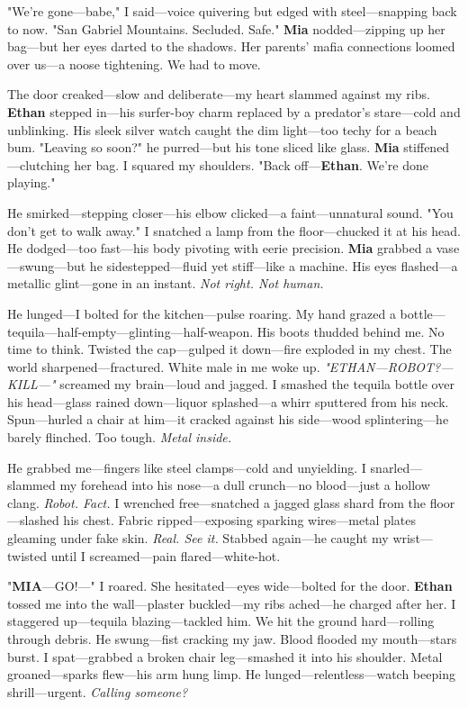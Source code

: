 \documentclass{article}
\begin{document}
"We’re gone—babe," I said—voice quivering but edged with steel—snapping back to now. "San Gabriel Mountains. Secluded. Safe." \textbf{Mia} nodded—zipping up her bag—but her eyes darted to the shadows. Her parents’ mafia connections loomed over us—a noose tightening. We had to move.

The door creaked—slow and deliberate—my heart slammed against my ribs. \textbf{Ethan} stepped in—his surfer-boy charm replaced by a predator’s stare—cold and unblinking. His sleek silver watch caught the dim light—too techy for a beach bum. "Leaving so soon?" he purred—but his tone sliced like glass. \textbf{Mia} stiffened—clutching her bag. I squared my shoulders. "Back off—\textbf{Ethan}. We’re done playing."

He smirked—stepping closer—his elbow clicked—a faint—unnatural sound. "You don’t get to walk away." I snatched a lamp from the floor—chucked it at his head. He dodged—too fast—his body pivoting with eerie precision. \textbf{Mia} grabbed a vase—swung—but he sidestepped—fluid yet stiff—like a machine. His eyes flashed—a metallic glint—gone in an instant. \textit{Not right. Not human.}

He lunged—I bolted for the kitchen—pulse roaring. My hand grazed a bottle—tequila—half-empty—glinting—half-weapon. His boots thudded behind me. No time to think. Twisted the cap—gulped it down—fire exploded in my chest. The world sharpened—fractured. White male in me woke up. \textit{"ETHAN—ROBOT?—KILL—"} screamed my brain—loud and jagged. I smashed the tequila bottle over his head—glass rained down—liquor splashed—a whirr sputtered from his neck. Spun—hurled a chair at him—it cracked against his side—wood splintering—he barely flinched. Too tough. \textit{Metal inside.}

He grabbed me—fingers like steel clamps—cold and unyielding. I snarled—slammed my forehead into his nose—a dull crunch—no blood—just a hollow clang. \textit{Robot. Fact.} I wrenched free—snatched a jagged glass shard from the floor—slashed his chest. Fabric ripped—exposing sparking wires—metal plates gleaming under fake skin. \textit{Real. See it.} Stabbed again—he caught my wrist—twisted until I screamed—pain flared—white-hot.

"\textbf{MIA}—GO!—" I roared. She hesitated—eyes wide—bolted for the door. \textbf{Ethan} tossed me into the wall—plaster buckled—my ribs ached—he charged after her. I staggered up—tequila blazing—tackled him. We hit the ground hard—rolling through debris. He swung—fist cracking my jaw. Blood flooded my mouth—stars burst. I spat—grabbed a broken chair leg—smashed it into his shoulder. Metal groaned—sparks flew—his arm hung limp. He lunged—relentless—watch beeping shrill—urgent. \textit{Calling someone?}
\end{document}
